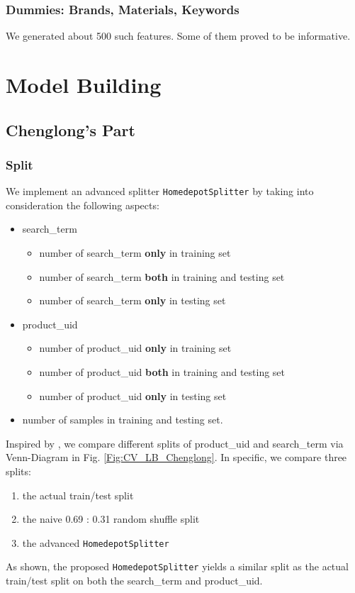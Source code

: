 \documentclass[12pt]{article}
\begin{document}
\subsubsection{Dummies: Brands, Materials, Keywords}
\label{subsubsec:dummies_IandK}
We generated about 500 such features. Some of them proved to be informative.









\section{Model Building}
\subsection{Chenglong's Part}
\subsubsection{Split}
We implement an advanced splitter \texttt{HomedepotSplitter} by taking into consideration the following aspects:
\begin{itemize}
\item search\_term
\begin{itemize}
\item number of search\_term \textbf{only} in training set
\item number of search\_term \textbf{both} in training and testing set
\item number of search\_term \textbf{only} in testing set
\end{itemize}
\item product\_uid
\begin{itemize}
\item number of product\_uid \textbf{only} in training set
\item number of product\_uid \textbf{both} in training and testing set
\item number of product\_uid \textbf{only} in testing set
\end{itemize}
\item number of samples in training and testing set.
\end{itemize}

Inspired by \cite{BenS}, we compare different splits of product\_uid and search\_term via Venn-Diagram in Fig. \ref{Fig:CV_LB_Chenglong}. In specific, we compare three splits:
\begin{enumerate}
\item the actual train/test split
\item the naive 0.69 : 0.31 random shuffle split
\item the advanced \texttt{HomedepotSplitter}
\end{enumerate}
As shown, the proposed \texttt{HomedepotSplitter} yields a similar split as the actual train/test split on both the search\_term and product\_uid.
\end{document}
